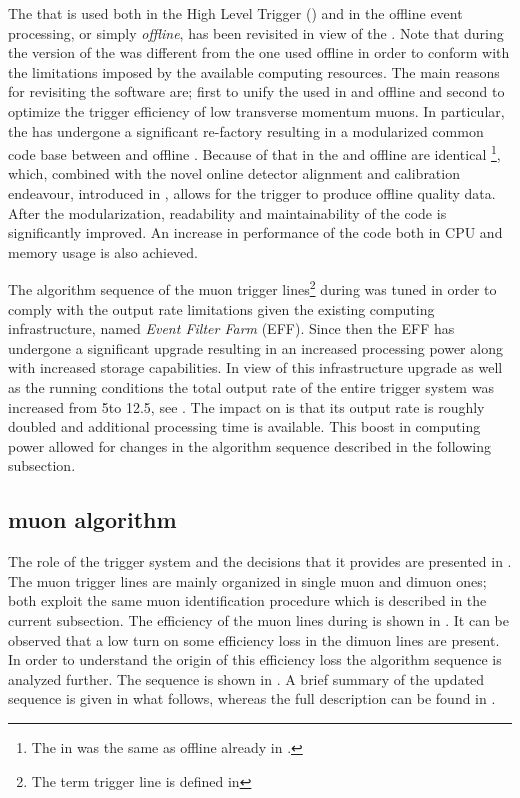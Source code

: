 
The \muonID \cite{LHCb-PUB-2009-013,LHCb-PUB-2010-002} that is used both in the High Level Trigger (\hlt) \cite{LHCb-PUB-2011-017}
and in the offline event processing, or simply {\it offline}, has been revisited in view of the \lhc \runtwo.
Note that during \runone the \hlt version of the \muonID was different from the one used offline in order
to conform with the limitations imposed by the available computing resources. The main reasons for revisiting
the software are; first to unify the \muonID used in \hlt and offline and second to optimize 
the trigger efficiency of low transverse momentum muons.
In particular, the \muonID has undergone a significant re-factory resulting in a modularized common code base
between \hlt and offline \cite{kevinThesis}. Because of that \muonID in the \hltone and offline
are identical \footnote{The \muonID in \hlttwo was the same as offline already in \runone.},
which, combined with the novel online detector alignment and calibration endeavour, introduced in ,
allows for the trigger to produce offline quality data. After the modularization, readability and maintainability
of the code is significantly improved. An increase in performance of the \muonID code both in CPU and memory usage
is also achieved.

The algorithm sequence of the \hltone muon trigger lines\footnote{The term trigger line is defined in }
during \runone was tuned in order to comply with the output rate limitations given the existing computing infrastructure,
named {\it Event Filter Farm} (EFF). Since then the EFF has undergone a significant upgrade resulting in an
increased processing power along with increased storage capabilities. In view of this infrastructure upgrade
as well as the \runtwo \lhc running conditions the total output rate of the entire trigger system was increased
from 5\khz to 12.5\khz, see . The impact on \hltone is that its output rate is
roughly doubled and additional processing time is available. This boost in computing power allowed for changes
in the \muonID algorithm sequence described in the following subsection.

\subsection{\hltone muon algorithm}
\label{hlt1run2}

The role of the trigger system and the decisions that it provides are presented in .
The \hltone muon trigger lines are mainly organized in single muon and dimuon ones; both exploit the same
muon identification procedure which is described in the current subsection.
The efficiency of the muon lines during \runone is shown in .
It can be observed that a low \pt turn on some efficiency loss in the dimuon lines are present.
In order to understand the origin of this efficiency loss the \hltone algorithm sequence \cite{LHCb-PUB-2011-017}
is analyzed further. The sequence is shown  in . A brief summary of the
updated sequence is given in what follows, whereas the full description can be found in \cite{kevinThesis}.

